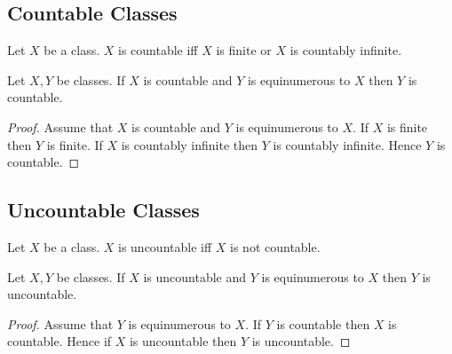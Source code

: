 \documentclass[10pt]{article}
\begin{document}
  \subsection{Countable Classes}

  \begin{forthel}
    \begin{definition}
      Let $X$ be a class.
      $X$ is countable iff $X$ is finite or $X$ is countably infinite.
    \end{definition}
  \end{forthel}

  \begin{forthel}
    \begin{proposition}
      Let $X, Y$ be classes.
      If $X$ is countable and $Y$ is equinumerous to $X$ then $Y$ is countable.
    \end{proposition}
    \begin{proof}
      Assume that $X$ is countable and $Y$ is equinumerous to $X$.
      If $X$ is finite then $Y$ is finite.
      If $X$ is countably infinite then $Y$ is countably infinite.
      Hence $Y$ is countable.
    \end{proof}
  \end{forthel}


  \subsection{Uncountable Classes}

  \begin{forthel}
    \begin{definition}
      Let $X$ be a class.
      $X$ is uncountable iff $X$ is not countable.
    \end{definition}
  \end{forthel}

  \begin{forthel}
    \begin{proposition}
      Let $X, Y$ be classes.
      If $X$ is uncountable and $Y$ is equinumerous to $X$ then $Y$ is
      uncountable.
    \end{proposition}
    \begin{proof}
      Assume that $Y$ is equinumerous to $X$.
      If $Y$ is countable then $X$ is countable.
      Hence if $X$ is uncountable then $Y$ is uncountable.
    \end{proof}
  \end{forthel}
\end{document}
